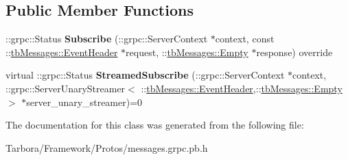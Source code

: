 \subsection*{Public Member Functions}
\begin{DoxyCompactItemize}
\item 
\mbox{\label{classtbMessages_1_1TarboraMessages_1_1WithStreamedUnaryMethod__Subscribe_a530f6657f19cb0aba61146ec870e1e39}} 
\+::grpc\+::\+Status {\bfseries Subscribe} (\+::grpc\+::\+Server\+Context $\ast$context, const \+::\hyperlink{classtbMessages_1_1EventHeader}{tb\+Messages\+::\+Event\+Header} $\ast$request, \+::\hyperlink{classtbMessages_1_1Empty}{tb\+Messages\+::\+Empty} $\ast$response) override
\item 
\mbox{\label{classtbMessages_1_1TarboraMessages_1_1WithStreamedUnaryMethod__Subscribe_ad504de3fbabd058ea59e6e89d61facf2}} 
virtual \+::grpc\+::\+Status {\bfseries Streamed\+Subscribe} (\+::grpc\+::\+Server\+Context $\ast$context, \+::grpc\+::\+Server\+Unary\+Streamer$<$ \+::\hyperlink{classtbMessages_1_1EventHeader}{tb\+Messages\+::\+Event\+Header},\+::\hyperlink{classtbMessages_1_1Empty}{tb\+Messages\+::\+Empty} $>$ $\ast$server\+\_\+unary\+\_\+streamer)=0
\end{DoxyCompactItemize}


The documentation for this class was generated from the following file\+:\begin{DoxyCompactItemize}
\item 
Tarbora/\+Framework/\+Protos/messages.\+grpc.\+pb.\+h\end{DoxyCompactItemize}
